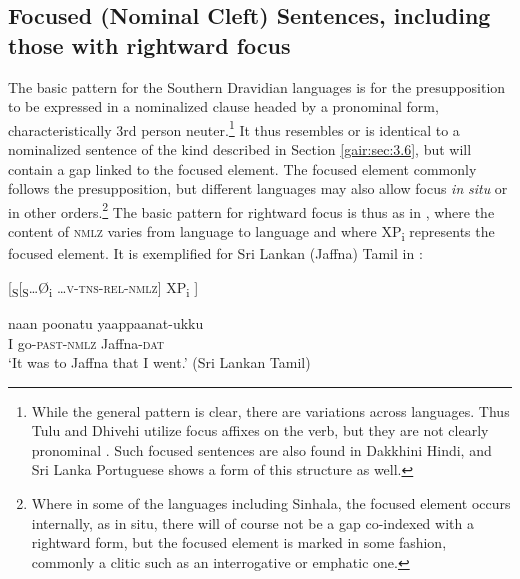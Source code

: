 \subsection{Focused (Nominal Cleft) Sentences, including those  with rightward focus}\label{gair:sec:3.7}
 The basic pattern for the Southern Dravidian languages is for the presupposition to be expressed in a nominalized clause headed by a pronominal form, characteristically 3rd person neuter.\footnote{While
  the general pattern is clear, there are variations across languages. Thus Tulu and Dhivehi utilize focus affixes on the verb, but they are not clearly pronominal \citep{Somashekar1999,CainEtAl2000}. Such focused sentences are also found in Dakkhini Hindi, and Sri Lanka Portuguese shows a form of this structure as well.
}
 It thus resembles or is identical to a nominalized sentence of the kind described in Section \ref{gair:sec:3.6}, but will contain a gap linked to the focused element. The focused element commonly follows the presupposition, but different languages may also allow focus \textit{in} \textit{situ} or in other orders.\footnote{Where \label{gair:fn:12}
  in some of the languages including Sinhala, the focused element occurs internally, as in situ, there will of course not be a gap co-indexed with a rightward form, but the focused element is marked in some fashion, commonly a clitic such as an interrogative or emphatic one.
}  
The basic pattern for rightward focus is thus as in , where the content of \textsc{nmlz} varies from language to language and  where XP\textsubscript{i} represents the focused element. It is exemplified for Sri Lankan (Jaffna) Tamil in :


\ea \label{ex3.7.1} 
  {}[\-\textsubscript{S}[\textsubscript{S}{\dots}{\O}\textsubscript{i} \dots \textsc{v}-\textsc{tns}-\textsc{rel}-\textsc{nmlz}]  XP\textsubscript{i} ] 
\z



\ea\label{ex3.7.2} 
\gll  naan poonatu  yaa{\lbar}ppaan{\dotn}at-ukku\\
  I  go-\textsc{past}-\textsc{nmlz} Jaffna-\textsc{dat} \\
  `It was to Jaffna that I went.'  (Sri Lankan Tamil)
\z

